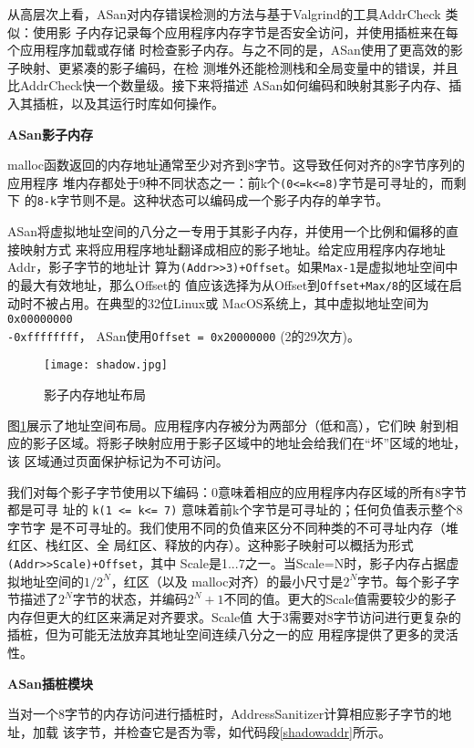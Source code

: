 从高层次上看，ASan对内存错误检测的方法与基于Valgrind的工具AddrCheck 类似：使用影
子内存记录每个应用程序内存字节是否安全访问，并使用插桩来在每个应用程序加载或存储
时检查影子内存。与之不同的是，ASan使用了更高效的影子映射、更紧凑的影子编码，在检
测堆外还能检测栈和全局变量中的错误，并且比AddrCheck快一个数量级。接下来将描述
ASan如何编码和映射其影子内存、插入其插桩，以及其运行时库如何操作。

\textbf{ASan影子内存}

malloc函数返回的内存地址通常至少对齐到8字节。这导致任何对齐的8字节序列的应用程序
堆内存都处于9种不同状态之一：前k个\texttt{(0<=k<=8)}字节是可寻址的，而剩下
的\texttt{8-k}字节则不是。这种状态可以编码成一个影子内存的单字节。

ASan将虚拟地址空间的八分之一专用于其影子内存，并使用一个比例和偏移的直接映射方式
来将应用程序地址翻译成相应的影子地址。给定应用程序内存地址Addr，影子字节的地址计
算为\texttt{(Addr>>3)+Offset}。如果\texttt{Max-1}是虚拟地址空间中的最大有效地址，那么Offset的
值应该选择为从Offset到\texttt{Offset+Max/8}的区域在启动时不被占用。在典型的32位Linux或
MacOS系统上，其中虚拟地址空间为\texttt{0x00000000\\-0xffffffff}， ASan使用\texttt{Offset =
0x20000000} (2的29次方)。
\begin{figure}[H]
	\centering
	\texttt{[image: shadow.jpg]}
	\caption{影子内存地址布局}
	\label{fig:shadow}
\end{figure}

图\ref{fig:shadow}展示了地址空间布局。应用程序内存被分为两部分（低和高），它们映
射到相应的影子区域。将影子映射应用于影子区域中的地址会给我们在“坏”区域的地址，该
区域通过页面保护标记为不可访问。

我们对每个影子字节使用以下编码：0意味着相应的应用程序内存区域的所有8字节都是可寻
址的 \texttt{k(1 <= k<= 7)} 意味着前k个字节是可寻址的；任何负值表示整个8字节字
是不可寻址的。我们使用不同的负值来区分不同种类的不可寻址内存（堆红区、栈红区、全
局红区、释放的内存）。这种影子映射可以概括为形式\texttt{(Addr>>Scale)+Offset}，其中
Scale是1...7之一。当Scale=N时，影子内存占据虚拟地址空间的$1/2^N$，红区（以及
malloc对齐）的最小尺寸是$2^N$字节。每个影子字节描述了$2^N$字节的状态，并编码$2^N
+1$不同的值。更大的Scale值需要较少的影子内存但更大的红区来满足对齐要求。Scale值
大于3需要对8字节访问进行更复杂的插桩，但为可能无法放弃其地址空间连续八分之一的应
用程序提供了更多的灵活性。

\textbf{ASan插桩模块}

当对一个8字节的内存访问进行插桩时，AddressSanitizer计算相应影子字节的地址，加载
该字节，并检查它是否为零，如代码段\ref{shadowaddr}所示。

